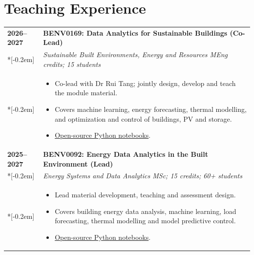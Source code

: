 \documentclass[11pt,a4paper]{article}
\makeatletter
\newlength{\datecolwidth}
\newenvironment{entrylist}{%
  \begin{longtable}{@{}p{\datecolwidth}@{\hspace{0.8em}}p{\dimexpr\linewidth-\datecolwidth-0.8em\relax}@{}}%
}{\end{longtable}}
\newcommand{\entry}[4]{%
  \textbf{#1} & \textbf{#2}\\*[-0.2em]
              & {\itshape #3}\\*[-0.2em]
              & #4\\[0.8em]
}
\makeatother
\begin{document}
\section*{Teaching Experience}
\begin{entrylist}
  \entry{2026--2027}{BENV0169: Data Analytics for Sustainable Buildings (Co-Lead)}
  {Sustainable Built Environments, Energy and Resources MEng\newline 30 credits; 15 students}{
    \begin{itemize}
      \vspace{-0.4em}
      \item Co-lead with Dr Rui Tang; jointly design, develop and teach the module material.
      \item Covers machine learning, energy forecasting, thermal modelling, and optimization and control of buildings, PV and storage.
      \item \href{https://github.com/akylasstrat/BENV0169_26-27}{Open-source Python notebooks}.
    \end{itemize}
  }

  \entry{2025--2027}{BENV0092: Energy Data Analytics in the Built Environment (Lead)}
  {Energy Systems and Data Analytics MSc; 15 credits; 60+ students}{
    \begin{itemize}
      \vspace{-0.4em}
      \item Lead material development, teaching and assessment design.
      \item Covers building energy data analysis, machine learning, load forecasting, thermal modelling and model predictive control.
      \item \href{https://github.com/akylasstrat/BENV0092}{Open-source Python notebooks}.
    \end{itemize}
  }

\end{entrylist}

\newpage
\end{document}
